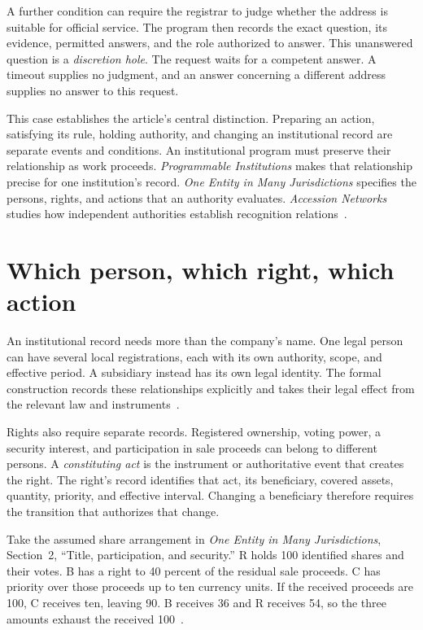 \documentclass{momentum}
\begin{document}
A further condition can require the registrar to judge whether the address is suitable for official service.
The program then records the exact question, its evidence, permitted answers, and the role authorized to answer.
This unanswered question is a \emph{discretion hole}.
The request waits for a competent answer.
A timeout supplies no judgment, and an answer concerning a different address supplies no answer to this request.

This case establishes the article's central distinction.
Preparing an action, satisfying its rule, holding authority, and changing an institutional record are separate events and conditions.
An institutional program must preserve their relationship as work proceeds.
\emph{Programmable Institutions} makes that relationship precise for one institution's record.
\emph{One Entity in Many Jurisdictions} specifies the persons, rights, and actions that an authority evaluates.
\emph{Accession Networks} studies how independent authorities establish recognition relations~\cite[Sections~2--4]{institutions}\cite[Section~2]{entity}\cite[Sections~2, 4]{accession}.

\section{Which person, which right, which action}
\label{sec:rights}

An institutional record needs more than the company's name.
One legal person can have several local registrations, each with its own authority, scope, and effective period.
A subsidiary instead has its own legal identity.
The formal construction records these relationships explicitly and takes their legal effect from the relevant law and instruments~\cite[Section~2]{entity}.

Rights also require separate records.
Registered ownership, voting power, a security interest, and participation in sale proceeds can belong to different persons.
A \emph{constituting act} is the instrument or authoritative event that creates the right.
The right's record identifies that act, its beneficiary, covered assets, quantity, priority, and effective interval.
Changing a beneficiary therefore requires the transition that authorizes that change.

Take the assumed share arrangement in \emph{One Entity in Many Jurisdictions}, Section~2, ``Title, participation, and security.''
R holds 100 identified shares and their votes.
B has a right to 40 percent of the residual sale proceeds.
C has priority over those proceeds up to ten currency units.
If the received proceeds are 100, C receives ten, leaving 90.
B receives 36 and R receives 54, so the three amounts exhaust the received 100~\cite[Section~2]{entity}.
\end{document}
